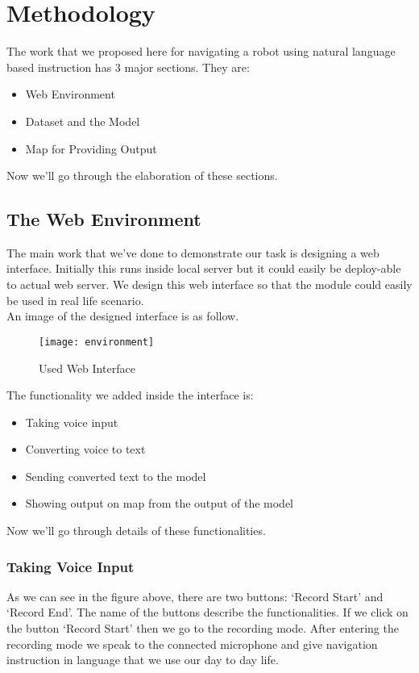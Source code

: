 \chapter{Methodology}
The work that we proposed here for navigating a robot using natural language based instruction has 3 major sections. They are:
\begin{itemize}
    \item Web Environment
    \item Dataset and the Model
    \item Map for Providing Output
\end{itemize}
Now we'll go through the elaboration of these sections. \\

\section{The Web Environment}
The main work that we've done to demonstrate our task is designing a web interface. Initially this runs inside local server but it could easily be deploy-able to actual web server. We design this web interface so that the module could easily be used in real life scenario.\\

An image of the designed interface is as follow. \\
\begin{figure}[h]
    \centering
    \texttt{[image: environment]}
    \caption{Used Web Interface}
\end{figure}
\vline

The functionality we added inside the interface is: \\
\begin{itemize}
    \item Taking voice input
    \item Converting voice to text
    \item Sending converted text to the model
    \item Showing output on map from the output of the model
\end{itemize}

Now we'll go through details of these functionalities. \\

\subsection{Taking Voice Input}
As we can see in the figure above, there are two buttons: `Record Start' and `Record End'. The name of the buttons describe the functionalities. If we click on the button `Record Start' then we go to the recording mode. After entering the recording mode we speak to the connected microphone and give navigation instruction in language that we use our day to day life. \\

